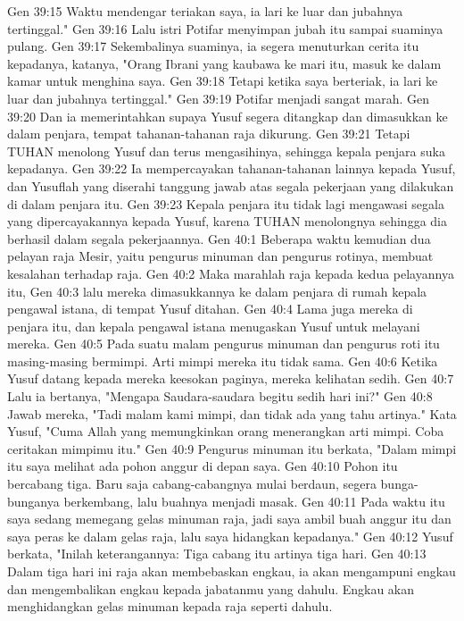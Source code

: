 Gen 39:15  Waktu mendengar teriakan saya, ia lari ke luar dan jubahnya tertinggal."
Gen 39:16  Lalu istri Potifar menyimpan jubah itu sampai suaminya pulang.
Gen 39:17  Sekembalinya suaminya, ia segera menuturkan cerita itu kepadanya, katanya, "Orang Ibrani yang kaubawa ke mari itu, masuk ke dalam kamar untuk menghina saya.
Gen 39:18  Tetapi ketika saya berteriak, ia lari ke luar dan jubahnya tertinggal."
Gen 39:19  Potifar menjadi sangat marah.
Gen 39:20  Dan ia memerintahkan supaya Yusuf segera ditangkap dan dimasukkan ke dalam penjara, tempat tahanan-tahanan raja dikurung.
Gen 39:21  Tetapi TUHAN menolong Yusuf dan terus mengasihinya, sehingga kepala penjara suka kepadanya.
Gen 39:22  Ia mempercayakan tahanan-tahanan lainnya kepada Yusuf, dan Yusuflah yang diserahi tanggung jawab atas segala pekerjaan yang dilakukan di dalam penjara itu.
Gen 39:23  Kepala penjara itu tidak lagi mengawasi segala yang dipercayakannya kepada Yusuf, karena TUHAN menolongnya sehingga dia berhasil dalam segala pekerjaannya.
Gen 40:1  Beberapa waktu kemudian dua pelayan raja Mesir, yaitu pengurus minuman dan pengurus rotinya, membuat kesalahan terhadap raja.
Gen 40:2  Maka marahlah raja kepada kedua pelayannya itu,
Gen 40:3  lalu mereka dimasukkannya ke dalam penjara di rumah kepala pengawal istana, di tempat Yusuf ditahan.
Gen 40:4  Lama juga mereka di penjara itu, dan kepala pengawal istana menugaskan Yusuf untuk melayani mereka.
Gen 40:5  Pada suatu malam pengurus minuman dan pengurus roti itu masing-masing bermimpi. Arti mimpi mereka itu tidak sama.
Gen 40:6  Ketika Yusuf datang kepada mereka keesokan paginya, mereka kelihatan sedih.
Gen 40:7  Lalu ia bertanya, "Mengapa Saudara-saudara begitu sedih hari ini?"
Gen 40:8  Jawab mereka, "Tadi malam kami mimpi, dan tidak ada yang tahu artinya." Kata Yusuf, "Cuma Allah yang memungkinkan orang menerangkan arti mimpi. Coba ceritakan mimpimu itu."
Gen 40:9  Pengurus minuman itu berkata, "Dalam mimpi itu saya melihat ada pohon anggur di depan saya.
Gen 40:10  Pohon itu bercabang tiga. Baru saja cabang-cabangnya mulai berdaun, segera bunga-bunganya berkembang, lalu buahnya menjadi masak.
Gen 40:11  Pada waktu itu saya sedang memegang gelas minuman raja, jadi saya ambil buah anggur itu dan saya peras ke dalam gelas raja, lalu saya hidangkan kepadanya."
Gen 40:12  Yusuf berkata, "Inilah keterangannya: Tiga cabang itu artinya tiga hari.
Gen 40:13  Dalam tiga hari ini raja akan membebaskan engkau, ia akan mengampuni engkau dan mengembalikan engkau kepada jabatanmu yang dahulu. Engkau akan menghidangkan gelas minuman kepada raja seperti dahulu.

